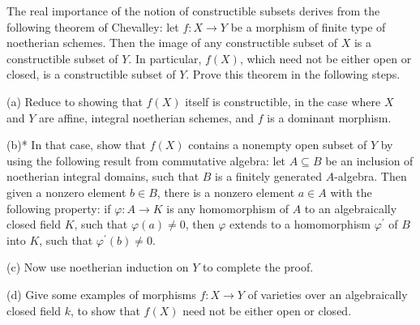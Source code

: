 \begin{exe}
	\label{2.3.19}
	The real importance of the notion of constructible subsets derives from the following theorem of Chevalley: let $f: X \rightarrow Y$ be a morphism of finite type of noetherian schemes. Then the image of any constructible subset of $X$ is a constructible subset of $Y$. In particular, $f(X)$, which need not be either open or closed, is a constructible subset of $Y$. Prove this theorem in the following steps.
	
	(a) Reduce to showing that $f(X)$ itself is constructible, in the case where $X$ and $Y$ are affine, integral noetherian schemes, and $f$ is a dominant morphism.
	
	(b)* In that case, show that $f(X)$ contains a nonempty open subset of $Y$ by using the following result from commutative algebra: let $A \subseteq B$ be an inclusion of noetherian integral domains, such that $B$ is a finitely generated $A$-algebra. Then given a nonzero element $b \in B$, there is a nonzero element $a \in A$ with the following property: if $\varphi: A \rightarrow K$ is any homomorphism of $A$ to an algebraically closed field $K$, such that $\varphi(a) \neq 0$, then $\varphi$ extends to a homomorphism $\varphi^{\prime}$ of $B$ into $K$, such that $\varphi^{\prime}(b) \neq 0$.
	
	(c) Now use noetherian induction on $Y$ to complete the proof.
	
	(d) Give some examples of morphisms $f: X \rightarrow Y$ of varieties over an algebraically closed field $k$, to show that $f(X)$ need not be either open or closed.
\end{exe}
